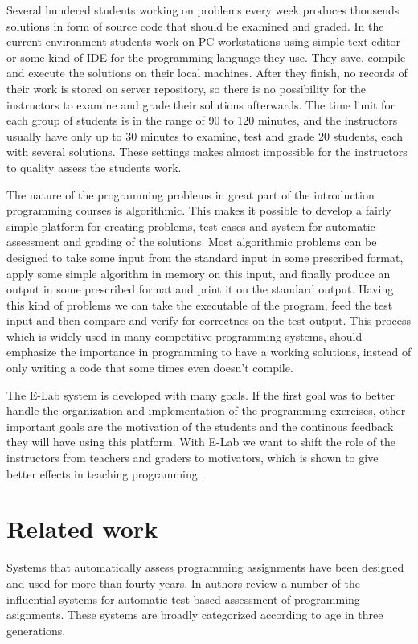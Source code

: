 \documentclass{article}
\begin{document}
Several hundered students working on problems every week produces thousends
solutions in form of source code that should be examined and graded. In the
current environment students work on PC workstations using simple text
editor or some kind of IDE for the programming language they use. They save,
compile and execute the solutions on their local machines. After they finish, no
records of their work is stored on server repository, so there is no
possibility for the instructors to examine and grade their solutions afterwards.
The time limit for each group of students is in the range of 90 to 120 minutes,
and the instructors usually have only up to 30 minutes to examine, test and
grade 20 students, each with several solutions. These settings makes almost
impossible for the instructors to quality assess the students work.

The nature of the programming problems in great part of the introduction
programming courses is algorithmic. This makes it possible to develop a fairly
simple platform for creating problems, test cases and system for automatic
assessment and grading of the solutions. Most algorithmic problems can be
designed to take some input from the standard input in some prescribed format,
apply some simple algorithm in memory on this input, and finally produce an
output in some prescribed format and print it on the standard output. Having
this kind of problems we can take the executable of the program, feed the
test input and then compare and verify for correctnes on the test output. This
process which is widely used in many competitive programming systems, should
emphasize the importance in programming to have a working solutions, instead of only
writing a code that some times even doesn't compile.

The E-Lab system is developed with many goals. If the first goal was to better
handle the organization and implementation of the programming exercises, other
important goals are the motivation of the students and the continous feedback
they will have using this platform. With E-Lab we want to shift the role of the
instructors from teachers and graders to motivators, which is shown to give
better effects in teaching programming \cite{jenkins2001teaching}.

\section{Related work}

Systems that automatically assess programming assignments have been designed and
used for more than fourty years. In \cite{douce2005automatic} authors review
a number of the influential systems for automatic test-based assessment
of programming asignments. These systems are broadly categorized according to
age in three generations. 
\end{document}

